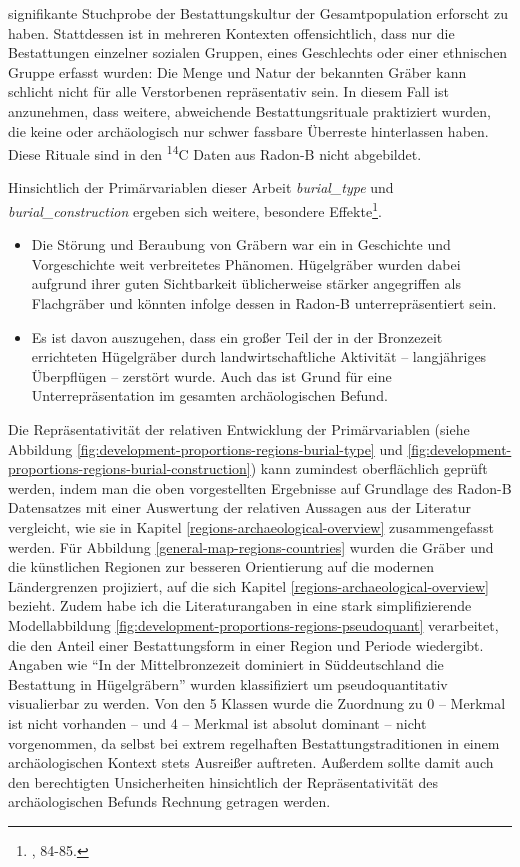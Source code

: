 \documentclass[openany,twoside,twocolumn]{book}
\providecommand{\tightlist}{%
  \setlength{\itemsep}{0pt}\setlength{\parskip}{0pt}}
\let\rmarkdownfootnote\footnote%
\def\footnote{\protect\rmarkdownfootnote}
\begin{document}
\begin{itemize}
  signifikante Stuchprobe der Bestattungskultur der Gesamtpopulation
  erforscht zu haben. Stattdessen ist in mehreren Kontexten
  offensichtlich, dass nur die Bestattungen einzelner sozialen Gruppen,
  eines Geschlechts oder einer ethnischen Gruppe erfasst wurden: Die
  Menge und Natur der bekannten Gräber kann schlicht nicht für alle
  Verstorbenen repräsentativ sein. In diesem Fall ist anzunehmen, dass
  weitere, abweichende Bestattungsrituale praktiziert wurden, die keine
  oder archäologisch nur schwer fassbare Überreste hinterlassen haben.
  Diese Rituale sind in den \textsuperscript{14}C Daten aus Radon-B
  nicht abgebildet.
\end{itemize}

Hinsichtlich der Primärvariablen dieser Arbeit \emph{burial\_type} und
\emph{burial\_construction} ergeben sich weitere, besondere
Effekte\footnote{\textcite{harding_european_2000}, 84-85.}.

\begin{itemize}
\tightlist
\item
  Die Störung und Beraubung von Gräbern war ein in Geschichte und
  Vorgeschichte weit verbreitetes Phänomen. Hügelgräber wurden dabei
  aufgrund ihrer guten Sichtbarkeit üblicherweise stärker angegriffen
  als Flachgräber und könnten infolge dessen in Radon-B
  unterrepräsentiert sein.
\item
  Es ist davon auszugehen, dass ein großer Teil der in der Bronzezeit
  errichteten Hügelgräber durch landwirtschaftliche Aktivität --
  langjähriges Überpflügen -- zerstört wurde. Auch das ist Grund für
  eine Unterrepräsentation im gesamten archäologischen Befund.
\end{itemize}

Die Repräsentativität der relativen Entwicklung der Primärvariablen
(siehe Abbildung \ref{fig:development-proportions-regions-burial-type}
und \ref{fig:development-proportions-regions-burial-construction}) kann
zumindest oberflächlich geprüft werden, indem man die oben vorgestellten
Ergebnisse auf Grundlage des Radon-B Datensatzes mit einer Auswertung
der relativen Aussagen aus der Literatur vergleicht, wie sie in Kapitel
\ref{regions-archaeological-overview} zusammengefasst werden. Für
Abbildung \ref{general-map-regions-countries} wurden die Gräber und die
künstlichen Regionen zur besseren Orientierung auf die modernen
Ländergrenzen projiziert, auf die sich Kapitel
\ref{regions-archaeological-overview} bezieht. Zudem habe ich die
Literaturangaben in eine stark simplifizierende Modellabbildung
\ref{fig:development-proportions-regions-pseudoquant} verarbeitet, die
den Anteil einer Bestattungsform in einer Region und Periode wiedergibt.
Angaben wie ``In der Mittelbronzezeit dominiert in Süddeutschland die
Bestattung in Hügelgräbern'' wurden klassifiziert um pseudoquantitativ
visualierbar zu werden. Von den 5 Klassen wurde die Zuordnung zu 0 --
Merkmal ist nicht vorhanden -- und 4 -- Merkmal ist absolut dominant --
nicht vorgenommen, da selbst bei extrem regelhaften
Bestattungstraditionen in einem archäologischen Kontext stets Ausreißer
auftreten. Außerdem sollte damit auch den berechtigten Unsicherheiten
hinsichtlich der Repräsentativität des archäologischen Befunds Rechnung
getragen werden.
\end{document}

